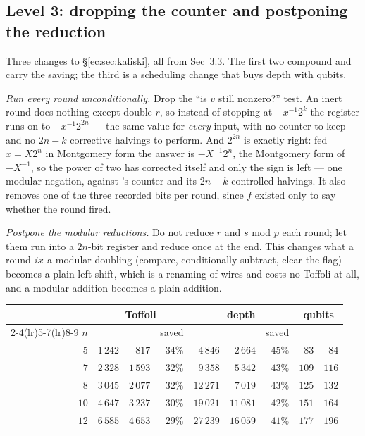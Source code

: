 \documentclass[11pt]{article}
\theoremstyle{plain}
\theoremstyle{remark}
\begin{document}
\subsection{Level 3: dropping the counter and postponing the reduction}\label{ec:sec:kalopt}

Three changes to \S\ref{ec:sec:kaliski}, all from \cite{ec:kim26} Sec~3.3. The first two compound
and carry the saving; the third is a scheduling change that buys depth with qubits.

\emph{Run every round unconditionally.} Drop the ``is $v$ still nonzero?'' test. An inert round does
nothing except double $r$, so instead of stopping at $-x^{-1}2^{k}$ the register runs on to
$-x^{-1}2^{2n}$ --- the same value for \emph{every} input, with no counter to keep and no $2n-k$
corrective halvings to perform. And $2^{2n}$ is exactly right: fed $x=X2^{n}$ in Montgomery form the
answer is $-X^{-1}2^{n}$, the Montgomery form of $-X^{-1}$, so the power of two has corrected itself
and only the sign is left --- one modular negation, against \cite{ec:hjnrs20}'s counter and its
$2n-k$ controlled halvings. It also removes one of the three recorded bits per round, since $f$ existed only to
say whether the round fired.

\emph{Postpone the modular reductions.} Do not reduce $r$ and $s$ mod $p$ each round; let them run
into a $2n$-bit register and reduce once at the end. This changes what a round \emph{is}: a modular
doubling (compare, conditionally subtract, clear the flag) becomes a plain left shift, which is a
renaming of wires and costs no Toffoli at all, and a modular addition becomes a plain addition.

\begin{center}\small
\begin{tabular}{@{}rrrrrrrrr@{}}
\toprule
& \multicolumn{3}{c}{Toffoli} & \multicolumn{3}{c}{depth} & \multicolumn{2}{c}{qubits}\\
\cmidrule(lr){2-4}\cmidrule(lr){5-7}\cmidrule(lr){8-9}
$n$ & \cite{ec:hjnrs20} & \cite{ec:kim26} & saved & \cite{ec:hjnrs20} & \cite{ec:kim26} & saved & \cite{ec:hjnrs20} & \cite{ec:kim26}\\
\midrule
$5$ & $1\,242$ & $817$ & $34\%$ & $4\,846$ & $2\,664$ & $45\%$ & $83$ & $84$\\
$7$ & $2\,328$ & $1\,593$ & $32\%$ & $9\,358$ & $5\,342$ & $43\%$ & $109$ & $116$\\
$8$ & $3\,045$ & $2\,077$ & $32\%$ & $12\,271$ & $7\,019$ & $43\%$ & $125$ & $132$\\
$10$ & $4\,647$ & $3\,237$ & $30\%$ & $19\,021$ & $11\,081$ & $42\%$ & $151$ & $164$\\
$12$ & $6\,585$ & $4\,653$ & $29\%$ & $27\,239$ & $16\,059$ & $41\%$ & $177$ & $196$\\
\bottomrule
\end{tabular}
\end{center}
\end{document}
